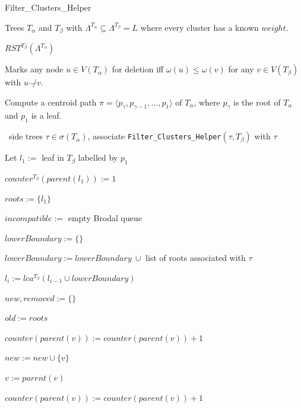 \documentclass{article}
\newcommand{\compatible}{\smile}
\newcommand{\leafset}{\Lambda}
\newcommand{\weight}{\omega}
\newcommand{\TA}{T_\alpha}
\newcommand{\TB}{T_\beta}
\begin{document}
    \begin{algorithm}[H]
        \caption{Filter\_Clusters\_Helper}
        \label{alg:filterclustershelper}

        \begin{algorithmic}[1]
            \Input Trees $\TA$ and $\TB$ with $\leafset^{\TA} \subseteq \leafset^{\TB} = L$ where every cluster has a known $weight$.

            \Output $RST^{\TB}(\leafset^{\TA})$

            \SideEffect Marks any node $u \in V(\TA)$ for deletion iff $\weight(u) \leq \weight(v)$ for any $v \in V(\TB)$ with $u \not\compatible v$.

            \State Compute a centroid path $\pi = \langle p_{\gamma}, p_{\gamma - 1}, ..., p_1 \rangle$ of $\TA$, where $p_{\gamma}$ is the root of $\TA$ and $p_1$ is a leaf.

            \State \algorithmicforall\ side trees $\tau \in \sigma(\TA)$,
                associate \texttt{Filter\_Clusters\_Helper}$(\tau, \TB)$ with $\tau$

            \State Let $l_1 :=$ leaf in $\TB$ labelled by $p_1$

            \State $counter^{\TB}(parent(l_1)) := 1$

            \State $roots := \{l_1\}$

            \State $incompatible :=$ empty Brodal queue

                \State $lowerBoundary := \{\}$

                    \State $lowerBoundary := lowerBoundary\ \cup$ list of roots associated with $\tau$
                \EndFor

                \State $l_i := lca^{\TB}(l_{i-1} \cup lowerBoundary)$

                \State $new, removed := \{\}$

                \State $old := roots$

                    \State $counter(parent(v)) := counter(parent(v)) + 1$

                    \State $new := new \cup \{v\}$

                    \State $v := parent(v)$

                        \State $counter(parent(v)) := counter(parent(v)) + 1$


\end{algorithmic}
\end{algorithm}
\end{document}
